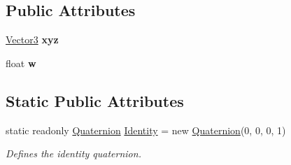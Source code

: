 \subsection*{Public Attributes}
\begin{DoxyCompactItemize}
\item 
\hypertarget{struct_open_t_k_1_1_quaternion_a507f0624584f5ff9ed6f0e45578452d0}{\hyperlink{struct_open_t_k_1_1_vector3}{Vector3} {\bfseries xyz}}\label{struct_open_t_k_1_1_quaternion_a507f0624584f5ff9ed6f0e45578452d0}

\item 
\hypertarget{struct_open_t_k_1_1_quaternion_a413d4be8475f8911ddee7ba3dbee3fd3}{float {\bfseries w}}\label{struct_open_t_k_1_1_quaternion_a413d4be8475f8911ddee7ba3dbee3fd3}

\end{DoxyCompactItemize}
\subsection*{Static Public Attributes}
\begin{DoxyCompactItemize}
\item 
static readonly \hyperlink{struct_open_t_k_1_1_quaternion}{Quaternion} \hyperlink{struct_open_t_k_1_1_quaternion_a32c6811aa364dda3e3c88600baed2593}{Identity} = new \hyperlink{struct_open_t_k_1_1_quaternion}{Quaternion}(0, 0, 0, 1)
\begin{DoxyCompactList}\small\item\em Defines the identity quaternion. \end{DoxyCompactList}\end{DoxyCompactItemize}
